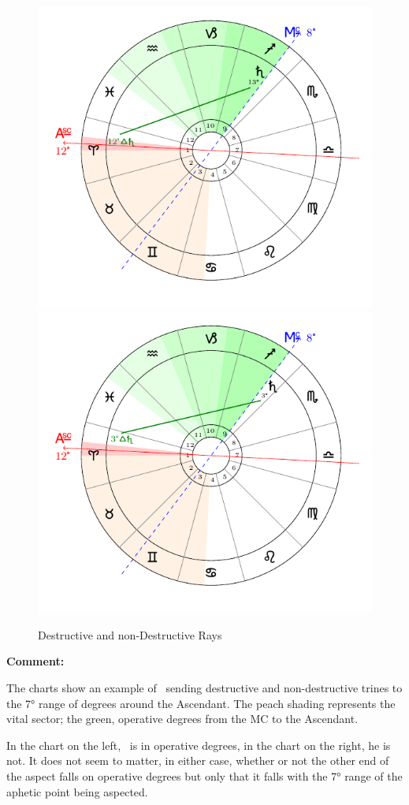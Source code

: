 \begin{figure}[H]
\includegraphics[width=.48\textwidth]{charts/3_03_3a}
\includegraphics[width=.48\textwidth]{charts/3_03_3b}
\caption{Destructive and non-Destructive Rays}
\end{figure}

\begin{mdframed}[backgroundcolor=cyan!5]
\textbf{Comment:}

The charts show an example of \Saturn\, sending destructive and non-destructive trines to the 7° range of degrees around the Ascendant. The peach shading represents the vital sector; the green, operative degrees from the MC to the Ascendant.

In the chart on the left, \Saturn\, is in operative degrees, in the chart on the right, he is not. It does not seem to matter, in either case, whether or not the other end of the aspect falls on operative degrees but only that it falls with the 7° range of the aphetic point being aspected.
\end{mdframed}

\newpage
